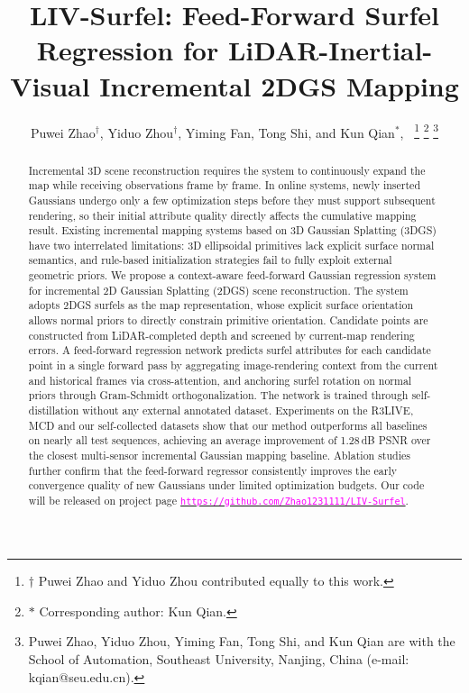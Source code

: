 \documentclass[letterpaper,journal]{IEEEtran}
\title{LIV-Surfel: Feed-Forward Surfel Regression for LiDAR-Inertial-Visual Incremental 2DGS Mapping}
\author{Puwei Zhao$^{\dagger}$, Yiduo Zhou$^{\dagger}$, Yiming Fan, Tong Shi, and Kun Qian$^{*}$,~\IEEEmembership{Member,~IEEE}%
\thanks{$\dagger$ Puwei Zhao and Yiduo Zhou contributed equally to this work.}%
\thanks{$*$ Corresponding author: Kun Qian.}
\thanks{Puwei Zhao, Yiduo Zhou, Yiming Fan, Tong Shi, and Kun Qian are with the School of Automation, Southeast University, Nanjing, China (e-mail: kqian@seu.edu.cn).}}
\begin{document}
\maketitle


\begin{abstract}

Incremental 3D scene reconstruction requires the system to continuously expand the map while receiving observations frame by frame. In online systems, newly inserted Gaussians undergo only a few optimization steps before they must support subsequent rendering, so their initial attribute quality directly affects the cumulative mapping result. Existing incremental mapping systems based on 3D Gaussian Splatting (3DGS) have two interrelated limitations: 3D ellipsoidal primitives lack explicit surface normal semantics, and rule-based initialization strategies fail to fully exploit external geometric priors. We propose a context-aware feed-forward Gaussian regression system for incremental 2D Gaussian Splatting (2DGS) scene reconstruction. The system adopts 2DGS surfels as the map representation, whose explicit surface orientation allows normal priors to directly constrain primitive orientation. Candidate points are constructed from LiDAR-completed depth and screened by current-map rendering errors. A feed-forward regression network predicts surfel attributes for each candidate point in a single forward pass by aggregating image-rendering context from the current and historical frames via cross-attention, and anchoring surfel rotation on normal priors through Gram-Schmidt orthogonalization. The network is trained through self-distillation without any external annotated dataset. Experiments on the R3LIVE, MCD and our self-collected datasets show that our method outperforms all baselines on nearly all test sequences, achieving an average improvement of 1.28\,dB PSNR over the closest multi-sensor incremental Gaussian mapping baseline. Ablation studies further confirm that the feed-forward regressor consistently improves the early convergence quality of new Gaussians under limited optimization budgets. Our code will be released on project page \href{https://github.com/Zhao1231111/LIV-Surfel}{\textcolor{magenta}{\nolinkurl{https://github.com/Zhao1231111/LIV-Surfel}}}.

\end{abstract}
\end{document}
